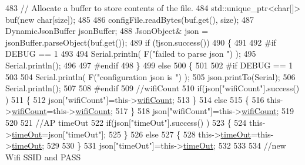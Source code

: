 \begin{DoxyCode}
483         \textcolor{comment}{// Allocate a buffer to store contents of the file.}
484         std::unique\_ptr<char[]> buf(\textcolor{keyword}{new} \textcolor{keywordtype}{char}[size]);
485 
486         configFile.readBytes(buf.get(), size);
487         DynamicJsonBuffer jsonBuffer;
488         JsonObject& json = jsonBuffer.parseObject(buf.get());
489         \textcolor{keywordflow}{if} (!json.success()) 
490         \{
491         
492 \textcolor{preprocessor}{        #if DEBUG == 1 }
493 
494             Serial.println( F(\textcolor{stringliteral}{"failed to parse json "}) );
495             Serial.println();
496         
497 \textcolor{preprocessor}{        #endif}
498         \} 
499         \textcolor{keywordflow}{else}
500         \{
501         
502 \textcolor{preprocessor}{        #if DEBUG == 1 }
503         
504             Serial.println( F(\textcolor{stringliteral}{"configuration json is "}) );
505             json.printTo(Serial);
506             Serial.println();
507 
508 \textcolor{preprocessor}{        #endif}
509             \textcolor{comment}{//wifiCount}
510             \textcolor{keywordflow}{if}(json[\textcolor{stringliteral}{"wifiCount"}].success() )
511             \{           
512                 json[\textcolor{stringliteral}{"wifiCount"}]=this->\hyperlink{classCoolWifi_ab133bd92fcb895b884deecd6678592e4}{wifiCount};
513             \}
514             \textcolor{keywordflow}{else}
515             \{
516                 this->\hyperlink{classCoolWifi_ab133bd92fcb895b884deecd6678592e4}{wifiCount}=this->\hyperlink{classCoolWifi_ab133bd92fcb895b884deecd6678592e4}{wifiCount};
517             \}
518             json[\textcolor{stringliteral}{"wifiCount"}]=this->\hyperlink{classCoolWifi_ab133bd92fcb895b884deecd6678592e4}{wifiCount};
519 
520             
521             \textcolor{comment}{//AP timeOut}
522             \textcolor{keywordflow}{if}(json[\textcolor{stringliteral}{"timeOut"}].success() )
523             \{
524                 this->\hyperlink{classCoolWifi_a952111605f25156588b5632caaba1c6f}{timeOut}=json[\textcolor{stringliteral}{"timeOut"}];
525             \}
526             \textcolor{keywordflow}{else}
527             \{
528                 this->\hyperlink{classCoolWifi_a952111605f25156588b5632caaba1c6f}{timeOut}=this->\hyperlink{classCoolWifi_a952111605f25156588b5632caaba1c6f}{timeOut};
529 
530             \}
531             json[\textcolor{stringliteral}{"timeOut"}]=this->\hyperlink{classCoolWifi_a952111605f25156588b5632caaba1c6f}{timeOut};
532             
533             
534             \textcolor{comment}{//new Wifi SSID and PASS}

\end{DoxyCode}
